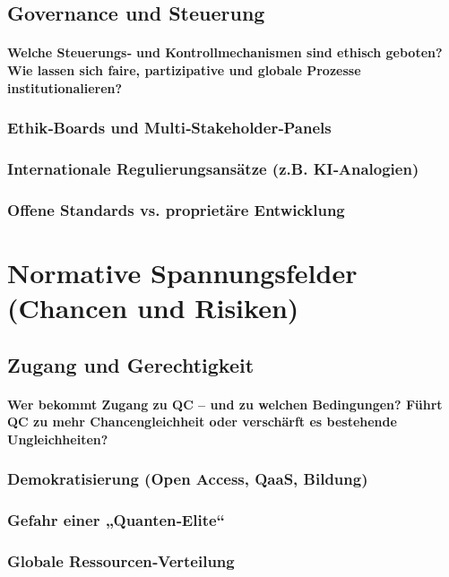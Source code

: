 \subsection{Governance und Steuerung}
\paragraph{Welche Steuerungs‑ und Kontrollmechanismen sind ethisch geboten? 
Wie lassen sich faire, partizipative und globale Prozesse institutionalieren?
}
\subsubsection{Ethik‑Boards und Multi‑Stakeholder‑Panels}
\subsubsection{Internationale Regulierungsansätze (z.B. KI‑Analogien)}
\subsubsection{Offene Standards vs. proprietäre Entwicklung}

\section{Normative Spannungsfelder (Chancen und Risiken)}

\subsection{Zugang und Gerechtigkeit}
\paragraph{Wer bekommt Zugang zu QC – und zu welchen Bedingungen? 
Führt QC zu mehr Chancengleichheit oder verschärft es bestehende Ungleichheiten?
}

\subsubsection{Demokratisierung (Open Access, QaaS, Bildung)}
\subsubsection{Gefahr einer „Quanten‑Elite“}
\subsubsection{Globale Ressourcen‑Verteilung}

